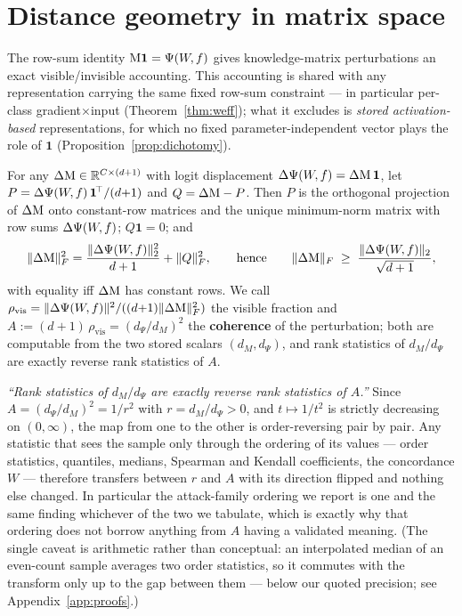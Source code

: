 \section{Distance geometry in matrix space}
\label{sec:geometry}

The row-sum identity $\mathrm{M}\mathbf 1=\Psi(W\!,f)$ gives knowledge-matrix perturbations an
exact visible/invisible accounting. This accounting is shared with any
representation carrying the same fixed row-sum constraint --- in particular
per-class gradient$\times$input (Theorem~\ref{thm:weff}); what it excludes is
\emph{stored activation-based} representations, for which no fixed
parameter-independent vector plays the role of $\mathbf 1$
(Proposition~\ref{prop:dichotomy}).

\begin{theorem}\label{thm:pyth}
For any $\Delta\mathrm{M}\in\mathbb{R}^{C\times(d+1)}$ with logit displacement
$\Delta\Psi(W\!,f)=\Delta\mathrm{M}\,\mathbf 1$, let $P=\Delta\Psi(W\!,f)\,\mathbf 1^{\!\top}/(d{+}1)$
and $Q=\Delta\mathrm{M}-P$. Then $P$ is the orthogonal projection of $\Delta\mathrm{M}$ onto
constant-row matrices and the unique minimum-norm matrix with row sums
$\Delta\Psi(W\!,f)$; $Q\mathbf 1=0$; and
\[
\|\Delta\mathrm{M}\|_F^2=\frac{\|\Delta\Psi(W\!,f)\|_2^2}{d+1}+\|Q\|_F^2,
\qquad\text{hence}\qquad
\|\Delta\mathrm{M}\|_F\;\ge\;\frac{\|\Delta\Psi(W\!,f)\|_2}{\sqrt{d+1}},
\]
with equality iff $\Delta\mathrm{M}$ has constant rows. We call
$\rho_{\mathrm{vis}}=\|\Delta\Psi(W\!,f)\|^2/((d{+}1)\|\Delta\mathrm{M}\|_F^2)$ the visible
fraction and $A:=(d{+}1)\,\rho_{\mathrm{vis}}=(d_\Psi/d_M)^2$ the
\textbf{coherence} of the perturbation; both are computable from the two
stored scalars $(d_M,d_\Psi)$, and rank statistics of $d_M/d_\Psi$ are exactly
reverse rank statistics of $A$.
\end{theorem}

\begin{clarifybox}
\emph{``Rank statistics of $d_M/d_\Psi$ are exactly reverse rank statistics of
$A$.''} Since $A=(d_\Psi/d_M)^2=1/r^2$ with $r=d_M/d_\Psi>0$, and $t\mapsto1/t^2$ is
strictly decreasing on $(0,\infty)$, the map from one to the other is
order-reversing pair by pair. Any statistic that sees the sample only through
the ordering of its values --- order statistics, quantiles, medians, Spearman
and Kendall coefficients, the concordance $W$ --- therefore transfers between
$r$ and $A$ with its direction flipped and nothing else changed. In
particular the attack-family ordering we report is one and the same finding
whichever of the two we tabulate, which is exactly why that ordering does not
borrow anything from $A$ having a validated meaning. (The single caveat is
arithmetic rather than conceptual: an interpolated median of an even-count
sample averages two order statistics, so it commutes with the transform only
up to the gap between them --- below our quoted precision; see
Appendix~\ref{app:proofs}.)
\end{clarifybox}

